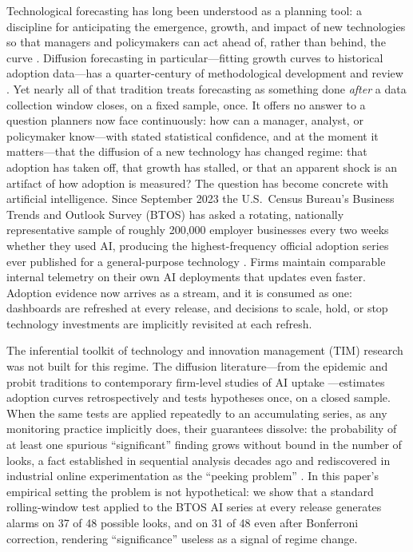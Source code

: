\documentclass[review,authoryear,12pt]{elsarticle}
\begin{document}
Technological forecasting has long been understood as a planning tool: a discipline for anticipating the emergence, growth, and impact of new technologies so that managers and policymakers can act ahead of, rather than behind, the curve \citep{martino2003}. Diffusion forecasting in particular---fitting growth curves to historical adoption data---has a quarter-century of methodological development and review \citep{meade2006}. Yet nearly all of that tradition treats forecasting as something done \emph{after} a data collection window closes, on a fixed sample, once. It offers no answer to a question planners now face continuously: how can a manager, analyst, or policymaker know---with stated statistical confidence, and at the moment it matters---that the diffusion of a new technology has changed regime: that adoption has taken off, that growth has stalled, or that an apparent shock is an artifact of how adoption is measured? The question has become concrete with artificial intelligence. Since September 2023 the U.S.\ Census Bureau's Business Trends and Outlook Survey (BTOS) has asked a rotating, nationally representative sample of roughly 200,000 employer businesses every two weeks whether they used AI, producing the highest-frequency official adoption series ever published for a general-purpose technology \citep{bonney2024}. Firms maintain comparable internal telemetry on their own AI deployments that updates even faster. Adoption evidence now arrives as a stream, and it is consumed as one: dashboards are refreshed at every release, and decisions to scale, hold, or stop technology investments are implicitly revisited at each refresh.

The inferential toolkit of technology and innovation management (TIM) research was not built for this regime. The diffusion literature---from the epidemic and probit traditions \citep{bass1969,geroski2000,rogers2003} to contemporary firm-level studies of AI uptake \citep{mcelheran2024,zolas2020}---estimates adoption curves retrospectively and tests hypotheses once, on a closed sample. When the same tests are applied repeatedly to an accumulating series, as any monitoring practice implicitly does, their guarantees dissolve: the probability of at least one spurious ``significant'' finding grows without bound in the number of looks, a fact established in sequential analysis decades ago \citep{wald1945,armitage1969} and rediscovered in industrial online experimentation as the ``peeking problem'' \citep{johari2022}. In this paper's empirical setting the problem is not hypothetical: we show that a standard rolling-window test applied to the BTOS AI series at every release generates alarms on 37 of 48 possible looks, and on 31 of 48 even after Bonferroni correction, rendering ``significance'' useless as a signal of regime change.
\end{document}
